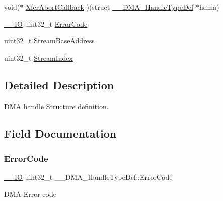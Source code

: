 \begin{DoxyCompactItemize}
\item 
void($\ast$ \hyperlink{struct_____d_m_a___handle_type_def_a5866f59e3a12760e559c4547ebf19d37}{Xfer\+Abort\+Callback} )(struct \hyperlink{struct_____d_m_a___handle_type_def}{\+\_\+\+\_\+\+D\+M\+A\+\_\+\+Handle\+Type\+Def} $\ast$hdma)
\item 
\hyperlink{core__sc300_8h_aec43007d9998a0a0e01faede4133d6be}{\+\_\+\+\_\+\+IO} uint32\+\_\+t \hyperlink{struct_____d_m_a___handle_type_def_a67a2a8b907bc9b5c0af87f9de2bffc29}{Error\+Code}
\item 
uint32\+\_\+t \hyperlink{struct_____d_m_a___handle_type_def_ab9250d33bdf9de7b87fa4325382518c4}{Stream\+Base\+Address}
\item 
uint32\+\_\+t \hyperlink{struct_____d_m_a___handle_type_def_a3ada2bc091757d7b92ab8ca70211ccae}{Stream\+Index}
\end{DoxyCompactItemize}


\subsection{Detailed Description}
D\+MA handle Structure definition. 

\subsection{Field Documentation}
\mbox{\label{struct_____d_m_a___handle_type_def_a67a2a8b907bc9b5c0af87f9de2bffc29}} 
\subsubsection{\texorpdfstring{Error\+Code}{ErrorCode}}
{\footnotesize\ttfamily \hyperlink{core__sc300_8h_aec43007d9998a0a0e01faede4133d6be}{\+\_\+\+\_\+\+IO} uint32\+\_\+t \+\_\+\+\_\+\+D\+M\+A\+\_\+\+Handle\+Type\+Def\+::\+Error\+Code}

D\+MA Error code \mbox{\label{struct_____d_m_a___handle_type_def_a3792cb34cedb0e2ab204e41b53ef75ad}} 
